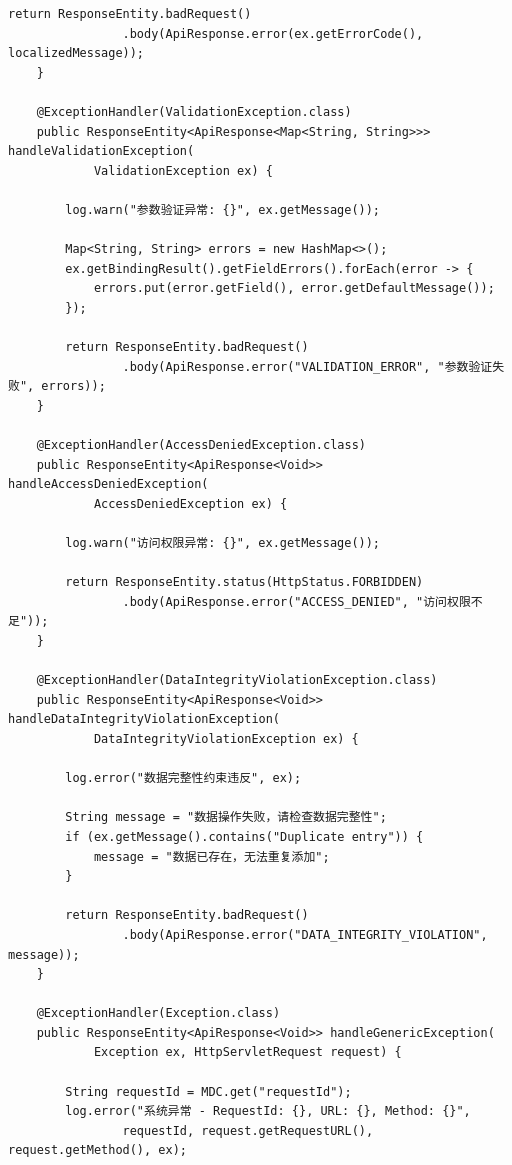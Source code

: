 \begin{lstlisting}[style=java]
        return ResponseEntity.badRequest()
                .body(ApiResponse.error(ex.getErrorCode(), localizedMessage));
    }
    
    @ExceptionHandler(ValidationException.class)
    public ResponseEntity<ApiResponse<Map<String, String>>> handleValidationException(
            ValidationException ex) {
        
        log.warn("参数验证异常: {}", ex.getMessage());
        
        Map<String, String> errors = new HashMap<>();
        ex.getBindingResult().getFieldErrors().forEach(error -> {
            errors.put(error.getField(), error.getDefaultMessage());
        });
        
        return ResponseEntity.badRequest()
                .body(ApiResponse.error("VALIDATION_ERROR", "参数验证失败", errors));
    }
    
    @ExceptionHandler(AccessDeniedException.class)
    public ResponseEntity<ApiResponse<Void>> handleAccessDeniedException(
            AccessDeniedException ex) {
        
        log.warn("访问权限异常: {}", ex.getMessage());
        
        return ResponseEntity.status(HttpStatus.FORBIDDEN)
                .body(ApiResponse.error("ACCESS_DENIED", "访问权限不足"));
    }
    
    @ExceptionHandler(DataIntegrityViolationException.class)
    public ResponseEntity<ApiResponse<Void>> handleDataIntegrityViolationException(
            DataIntegrityViolationException ex) {
        
        log.error("数据完整性约束违反", ex);
        
        String message = "数据操作失败，请检查数据完整性";
        if (ex.getMessage().contains("Duplicate entry")) {
            message = "数据已存在，无法重复添加";
        }
        
        return ResponseEntity.badRequest()
                .body(ApiResponse.error("DATA_INTEGRITY_VIOLATION", message));
    }
    
    @ExceptionHandler(Exception.class)
    public ResponseEntity<ApiResponse<Void>> handleGenericException(
            Exception ex, HttpServletRequest request) {
        
        String requestId = MDC.get("requestId");
        log.error("系统异常 - RequestId: {}, URL: {}, Method: {}", 
                requestId, request.getRequestURL(), request.getMethod(), ex);
        

\end{lstlisting}

